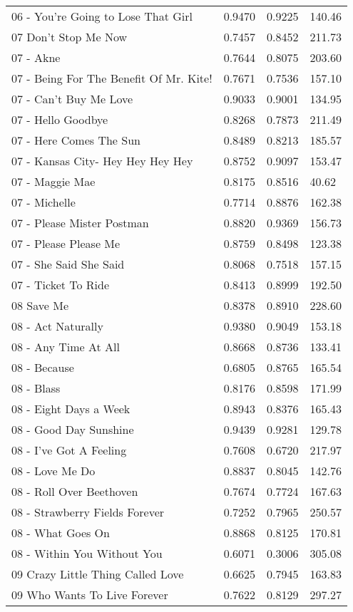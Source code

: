 \begin{longtable}[c]{|l|c|l|l|}
06 - You're Going to Lose That Girl & 0.9470 & 0.9225 & 140.46 \\
07 Don't Stop Me Now & 0.7457 & 0.8452 & 211.73 \\
07 - Akne & 0.7644 & 0.8075 & 203.60 \\
07 - Being For The Benefit Of Mr. Kite! & 0.7671 & 0.7536 & 157.10 \\
07 - Can't Buy Me Love & 0.9033 & 0.9001 & 134.95 \\
07 - Hello Goodbye & 0.8268 & 0.7873 & 211.49 \\
07 - Here Comes The Sun & 0.8489 & 0.8213 & 185.57 \\
07 - Kansas City- Hey  Hey  Hey  Hey & 0.8752 & 0.9097 & 153.47 \\
07 - Maggie Mae & 0.8175 & 0.8516 & 40.62 \\
07 - Michelle & 0.7714 & 0.8876 & 162.38 \\
07 - Please Mister Postman & 0.8820 & 0.9369 & 156.73 \\
07 - Please Please Me & 0.8759 & 0.8498 & 123.38 \\
07 - She Said She Said & 0.8068 & 0.7518 & 157.15 \\
07 - Ticket To Ride & 0.8413 & 0.8999 & 192.50 \\
08 Save Me & 0.8378 & 0.8910 & 228.60 \\
08 - Act Naturally & 0.9380 & 0.9049 & 153.18 \\
08 - Any Time At All & 0.8668 & 0.8736 & 133.41 \\
08 - Because & 0.6805 & 0.8765 & 165.54 \\
08 - Blass & 0.8176 & 0.8598 & 171.99 \\
08 - Eight Days a Week & 0.8943 & 0.8376 & 165.43 \\
08 - Good Day Sunshine & 0.9439 & 0.9281 & 129.78 \\
08 - I've Got A Feeling & 0.7608 & 0.6720 & 217.97 \\
08 - Love Me Do & 0.8837 & 0.8045 & 142.76 \\
08 - Roll Over Beethoven & 0.7674 & 0.7724 & 167.63 \\
08 - Strawberry Fields Forever & 0.7252 & 0.7965 & 250.57 \\
08 - What Goes On & 0.8868 & 0.8125 & 170.81 \\
08 - Within You Without You & 0.6071 & 0.3006 & 305.08 \\
09 Crazy Little Thing Called Love & 0.6625 & 0.7945 & 163.83 \\
09 Who Wants To Live Forever & 0.7622 & 0.8129 & 297.27 \\

\end{longtable}
